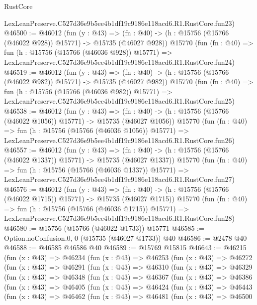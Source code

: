 \begin{lexlean}{RustCore}
\begin{coremodule}
    LexLeanPreserve.C527d36e9b5ee4b1df19c9186e118acd6.R1.RustCore.fun23)
@46500 := @46012
    (fun (y : @43) =>
    (fn : @40) -> (h : @15756 (@15766 (@46022 @928)) @15771) -> @15735 (@46027 @928))
    @15770
    (fun (fn : @40) =>
    fun (h : @15756 (@15766 (@46036 @928)) @15771) =>
    LexLeanPreserve.C527d36e9b5ee4b1df19c9186e118acd6.R1.RustCore.fun24)
@46519 := @46012
    (fun (y : @43) =>
    (fn : @40) -> (h : @15756 (@15766 (@46022 @982)) @15771) -> @15735 (@46027 @982))
    @15770
    (fun (fn : @40) =>
    fun (h : @15756 (@15766 (@46036 @982)) @15771) =>
    LexLeanPreserve.C527d36e9b5ee4b1df19c9186e118acd6.R1.RustCore.fun25)
@46538 := @46012
    (fun (y : @43) =>
    (fn : @40) -> (h : @15756 (@15766 (@46022 @1056)) @15771) -> @15735 (@46027 @1056))
    @15770
    (fun (fn : @40) =>
    fun (h : @15756 (@15766 (@46036 @1056)) @15771) =>
    LexLeanPreserve.C527d36e9b5ee4b1df19c9186e118acd6.R1.RustCore.fun26)
@46557 := @46012
    (fun (y : @43) =>
    (fn : @40) -> (h : @15756 (@15766 (@46022 @1337)) @15771) -> @15735 (@46027 @1337))
    @15770
    (fun (fn : @40) =>
    fun (h : @15756 (@15766 (@46036 @1337)) @15771) =>
    LexLeanPreserve.C527d36e9b5ee4b1df19c9186e118acd6.R1.RustCore.fun27)
@46576 := @46012
    (fun (y : @43) =>
    (fn : @40) -> (h : @15756 (@15766 (@46022 @1715)) @15771) -> @15735 (@46027 @1715))
    @15770
    (fun (fn : @40) =>
    fun (h : @15756 (@15766 (@46036 @1715)) @15771) =>
    LexLeanPreserve.C527d36e9b5ee4b1df19c9186e118acd6.R1.RustCore.fun28)
@46580 := @15756 (@15766 (@46022 @1733)) @15771
@46585 := Option.noConfusion.{0, 0} (@15735 (@46027 @1733)) @40
@46586 := @2478 @40
@46588 := @46585 @46586 @40
@46589 := @15769 @15815
@46643 := @46215
    (fun (x : @43) =>
    @46234
      (fun (x : @43) =>
      @46253
        (fun (x : @43) =>
        @46272
          (fun (x : @43) =>
          @46291
            (fun (x : @43) =>
            @46310
              (fun (x : @43) =>
              @46329
                (fun (x : @43) =>
                @46348
                  (fun (x : @43) =>
                  @46367
                    (fun (x : @43) =>
                    @46386
                      (fun (x : @43) =>
                      @46405
                        (fun (x : @43) =>
                        @46424
                          (fun (x : @43) =>
                          @46443
                            (fun (x : @43) =>
                            @46462
                              (fun (x : @43) =>
                              @46481
                                (fun (x : @43) =>
                                @46500

\end{coremodule}
\end{lexlean}
